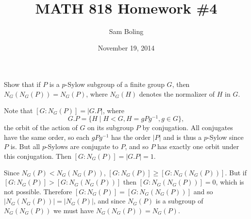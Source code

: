 \documentclass{article}
\title{MATH 818 Homework \#4}
\date{November 19, 2014}
\author{Sam Boling}
\newcounter{Problem}
\newenvironment{Problem}{\begin{Exercise}[name={Problem},
                                          counter={Problem}]}
                        {\end{Exercise}}
\begin{document}
\begin{titlepage}
\maketitle
\end{titlepage}

\begin{Problem}
Show that if $P$ is a $p$-Sylow subgroup of a finite group $G$, then
$N_G(N_G(P)) = N_G(P)$, where $N_G(H)$ denotes the normalizer of $H$
in $G$.
\end{Problem}

\begin{Answer}
Note that $[G : N_G(P)] = |G . P|$, where
$$
G . P = \{ H \mid H < G, H = gPg^{-1}, g \in G \},
$$
the orbit of the action of $G$ on its subgroup $P$ by conjugation.
All conjugates have the same order, so each $gPg^{-1}$ has the order
$|P|$ and is thus a $p$-Sylow since $P$ is. But all $p$-Sylows are
conjugate to $P$, and so $P$ has exactly one orbit under this
conjugation. Then $[G : N_G(P)] = |G . P| = 1$.

Since $N_G(P) < N_G(N_G(P))$,
$[G : N_G(P)] \geq [G : N_G(N_G(P))]$. But if
$[G : N_G(P)] > [G : N_G(N_G(P))]$ then $[G : N_G(N_G(P))] = 0$, which
is not possible. Therefore $[G : N_G(P)] = [G : N_G(N_G(P))]$ and so
$|N_G(N_G(P))| = |N_G(P)|$, and since $N_G(P)$ is a subgroup of
$N_G(N_G(P))$ we must have $N_G(N_G(P)) = N_G(P)$.
\end{Answer}

\pagebreak
\end{document}
